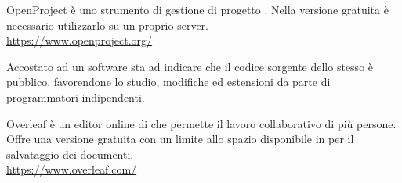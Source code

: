 OpenProject è uno strumento di gestione di progetto . Nella versione gratuita è necessario utilizzarlo su un proprio server.\\
\url{https://www.openproject.org/}

Accostato ad un software sta ad indicare che il codice sorgente dello stesso è pubblico, favorendone lo studio, modifiche ed estensioni da parte di programmatori indipendenti.

Overleaf è un editor online di  che permette il lavoro collaborativo di più persone. Offre una versione gratuita con un limite allo spazio disponibile in  per il salvataggio dei documenti.\\
\url{https://www.overleaf.com/}
\clearpage
